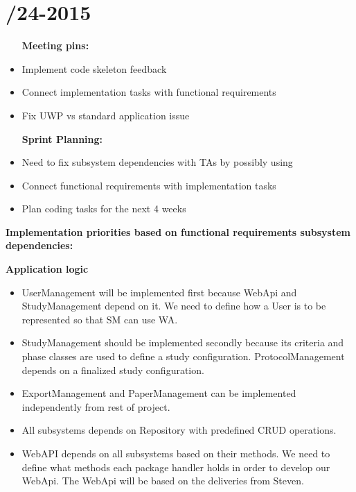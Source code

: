 \section{/24-2015} %
\attend{\at}{\at}{\at}{\at}


\begin{itemize}
	\item [\textbf{Meeting pins:}]
	\item Implement code skeleton feedback
	\item Connect implementation tasks with functional requirements
	\item Fix UWP vs standard application issue 
\end{itemize}

\begin{itemize}
	\item [\textbf{Sprint Planning:}]
	\item Need to fix subsystem dependencies with TAs by possibly using 
	\item Connect functional requirements with implementation tasks
	\item Plan coding tasks for the next 4 weeks 
\end{itemize}

\newpage

\textbf{Implementation priorities based on functional requirements subsystem dependencies:}

\textbf{Application logic}
\begin{itemize}
	\item UserManagement will be implemented first because WebApi and StudyManagement depend on it. We need to define how a User is to be represented so that SM can use WA. 
	\item StudyManagement should be implemented secondly because its criteria and phase classes are used to define a study configuration. ProtocolManagement depends on a finalized study configuration.
	\item ExportManagement and PaperManagement can be implemented independently from rest of project. 
	\item All subsystems depends on Repository with predefined CRUD operations.
	\item WebAPI depends on all subsystems based on their methods. We need to define what methods each package handler holds in order to develop our WebApi. The WebApi will be based on the deliveries from Steven. 
\end{itemize} 

